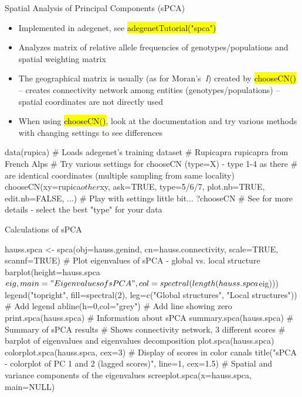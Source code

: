 \documentclass[compress, ucs, xelatex, 11pt, xcolor=svgnames,
  hyperref={
    bookmarks=true,
    unicode=true,
    colorlinks=true,
    pdftitle={Molecular data in R},
    plainpages=false,
    pdfauthor={Vojtech Zeisek},
    pdfsubject={Course about phylogeny and evolution in R},
    pdfcreator={XeLaTeX},
    pdfkeywords={R, evolution, phylogeny, molecular data},
    linkcolor=Tomato,
    anchorcolor=SaddleBrown,
    citecolor=Goldenrod,
    filecolor=DarkMagenta,
    menucolor=Sienna,
    urlcolor=DarkTurquoise,
    pdftex},
  url={hyphens, lowtilde} %
  ]{beamer}
\renewcommand{\texttt}[1]{\hl{\ttfamily #1}}
\begin{document}
\begin{frame}[fragile]{Spatial Analysis of Principal Components (sPCA)}
  \begin{itemize}
    \item Implemented in adegenet, see \texttt{adegenetTutorial("spca")}
    \item Analyzes matrix of relative allele frequencies of genotypes/populations and spatial weighting matrix
    \item The geographical matrix is usually (as for Moran's~\textit{I}) created by \texttt{chooseCN()} -- creates connectivity network among entities (genotypes/populations) -- spatial coordinates are not directly used
    \item When using \texttt{chooseCN()}, look at the documentation and try various methods with changing settings to see differences
  \end{itemize}
  \begin{spluscode}
    data(rupica) # Loads adegenet's training dataset
                 # Rupicapra rupicapra from French Alps
    # Try various settings for chooseCN (type=X) - type 1-4 as there
    # are identical coordinates (multiple sampling from same locality)
    chooseCN(xy=rupica$other$xy, ask=TRUE, type=5/6/7, plot.nb=TRUE,
      edit.nb=FALSE, ...) # Play with settings little bit...
    ?chooseCN # See for more details - select the best "type" for your data
  \end{spluscode}
\end{frame}

\begin{frame}[fragile]{Calculations of sPCA}
  \begin{spluscode}
    hauss.spca <- spca(obj=hauss.genind, cn=hauss.connectivity,
      scale=TRUE, scannf=TRUE)
    # Plot eigenvalues of sPCA - global vs. local structure
    barplot(height=hauss.spca$eig, main="Eigenvalues of sPCA",
      col=spectral(length(hauss.spca$eig)))
    legend("topright", fill=spectral(2), leg=c("Global structures",
      "Local structures")) # Add legend
    abline(h=0,col="grey") # Add line showing zero
    print.spca(hauss.spca) # Information about sPCA
    summary.spca(hauss.spca) # Summary of sPCA results
    # Shows connectivity network, 3 different scores
    # barplot of eigenvalues and eigenvalues decomposition
    plot.spca(hauss.spca)
    colorplot.spca(hauss.spca, cex=3) # Display of scores in color canals
    title("sPCA - colorplot of PC 1 and 2 (lagged scores)", line=1, cex=1.5)
    # Spatial and variance components of the eigenvalues
    screeplot.spca(x=hauss.spca, main=NULL)
  \end{spluscode}
\end{frame}
\end{document}
